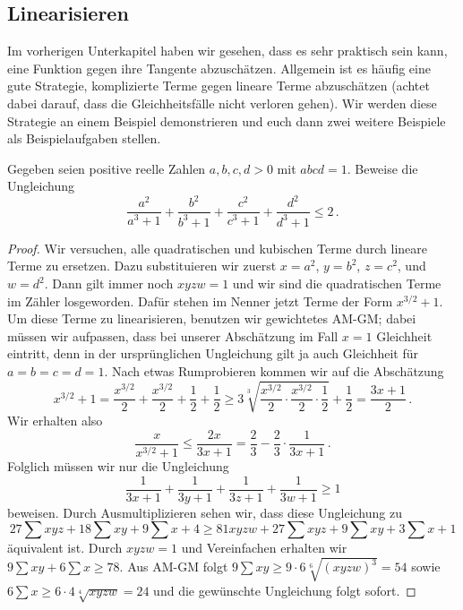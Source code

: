 \subsection*{Linearisieren}
Im vorherigen Unterkapitel haben wir gesehen, dass es sehr praktisch sein kann, eine Funktion gegen ihre Tangente abzuschätzen. Allgemein ist es häufig eine gute Strategie, komplizierte Terme gegen lineare Terme abzuschätzen (achtet dabei darauf, dass die Gleichheitsfälle nicht verloren gehen). Wir werden diese Strategie an einem Beispiel demonstrieren und euch dann zwei weitere Beispiele als Beispielaufgaben stellen.
\begin{aufgabe*}\label{aufgabe:AIMO2014}
	Gegeben seien positive reelle Zahlen $a,b,c,d>0$ mit $abcd=1$. Beweise die Ungleichung
	\begin{equation*}
		\frac{a^2}{a^3+1}+\frac{b^2}{b^3+1}+\frac{c^2}{c^3+1}+\frac{d^2}{d^3+1}\leqslant 2\,.
	\end{equation*}
\end{aufgabe*}
\begin{proof}
	Wir versuchen, alle quadratischen und kubischen Terme durch lineare Terme zu ersetzen. Dazu substituieren wir zuerst $x=a^2$, $y=b^2$, $z=c^2$, und $w=d^2$. Dann gilt immer noch $xyzw=1$ und wir sind die quadratischen Terme im Zähler losgeworden. Dafür stehen im Nenner jetzt Terme der Form $x^{3/2}+1$. Um diese Terme zu linearisieren, benutzen wir gewichtetes AM-GM; dabei müssen wir aufpassen, dass bei unserer Abschätzung im Fall $x=1$ Gleichheit eintritt, denn in der ursprünglichen Ungleichung gilt ja auch Gleichheit für $a=b=c=d=1$. Nach etwas Rumprobieren kommen wir auf die Abschätzung
	\begin{equation*}
		x^{3/2}+1=\frac{x^{3/2}}2+\frac{x^{3/2}}2+\frac12+\frac12\geqslant 3\sqrt[3]{\frac{x^{3/2}}2\cdot \frac{x^{3/2}}2\cdot\frac12}+\frac12=\frac{3x+1}{2}\,.
	\end{equation*}
	Wir erhalten also
	\begin{equation*}
		\frac{x}{x^{3/2}+1}\leqslant \frac{2x}{3x+1}=\frac23-\frac23\cdot \frac{1}{3x+1}\,.
	\end{equation*}
	Folglich müssen wir nur die Ungleichung
	\begin{equation*}
		\frac1{3x+1}+\frac1{3y+1}+\frac1{3z+1}+\frac1{3w+1}\geqslant 1
	\end{equation*}
	beweisen. Durch Ausmultiplizieren sehen wir, dass diese Ungleichung zu
	\begin{equation*}
		27\sum xyz+18\sum xy+9\sum x+4\geqslant 81xyzw+27\sum xyz+9\sum xy+3\sum x+1
	\end{equation*}
	äquivalent ist. Durch $xyzw=1$ und Vereinfachen erhalten wir $9\sum xy+6\sum x\geqslant 78$. Aus AM-GM folgt $9\sum xy\geqslant 9\cdot 6\sqrt[6]{(xyzw)^3}=54$ sowie $6\sum x\geqslant 6\cdot 4\sqrt[4]{xyzw}=24$ und die gewünschte Ungleichung folgt sofort.
\end{proof}

